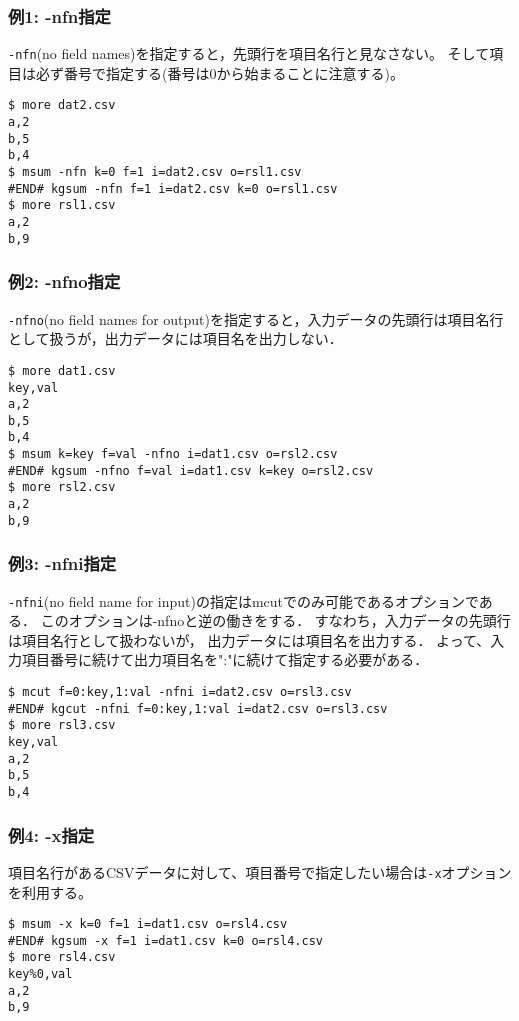\subsubsection*{例1: -nfn指定}

\verb|-nfn|(no field names)を指定すると，先頭行を項目名行と見なさない。
そして項目は必ず番号で指定する(番号は0から始まることに注意する)。


\begin{Verbatim}[baselinestretch=0.7,frame=single]
$ more dat2.csv
a,2
b,5
b,4
$ msum -nfn k=0 f=1 i=dat2.csv o=rsl1.csv
#END# kgsum -nfn f=1 i=dat2.csv k=0 o=rsl1.csv
$ more rsl1.csv
a,2
b,9
\end{Verbatim}
\subsubsection*{例2: -nfno指定}

\verb|-nfno|(no field names for output)を指定すると，入力データの先頭行は項目名行として扱うが，出力データには項目名を出力しない．


\begin{Verbatim}[baselinestretch=0.7,frame=single]
$ more dat1.csv
key,val
a,2
b,5
b,4
$ msum k=key f=val -nfno i=dat1.csv o=rsl2.csv
#END# kgsum -nfno f=val i=dat1.csv k=key o=rsl2.csv
$ more rsl2.csv
a,2
b,9
\end{Verbatim}
\subsubsection*{例3: -nfni指定}

\verb|-nfni|(no field name for input)の指定はmcutでのみ可能であるオプションである．
このオプションは-nfnoと逆の働きをする．
すなわち，入力データの先頭行は項目名行として扱わないが，
出力データには項目名を出力する．
よって、入力項目番号に続けて出力項目名を":"に続けて指定する必要がある．


\begin{Verbatim}[baselinestretch=0.7,frame=single]
$ mcut f=0:key,1:val -nfni i=dat2.csv o=rsl3.csv
#END# kgcut -nfni f=0:key,1:val i=dat2.csv o=rsl3.csv
$ more rsl3.csv
key,val
a,2
b,5
b,4
\end{Verbatim}
\subsubsection*{例4: -x指定}

項目名行があるCSVデータに対して、項目番号で指定したい場合は\verb|-x|オプションを利用する。


\begin{Verbatim}[baselinestretch=0.7,frame=single]
$ msum -x k=0 f=1 i=dat1.csv o=rsl4.csv
#END# kgsum -x f=1 i=dat1.csv k=0 o=rsl4.csv
$ more rsl4.csv
key%0,val
a,2
b,9
\end{Verbatim}
